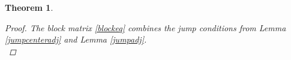 \documentclass[12pt]{article}
\def\Z{{\mathbb Z}}
\newtheorem{theorem}{Theorem}
\begin{document}
\begin{theorem}



\begin{proof}
The block matrix \eqref{blockeq} combines the jump conditions from Lemma \ref{jumpcenteradj} and Lemma \ref{jumpadj}. \\










\end{proof}
\end{theorem}
\end{document}
